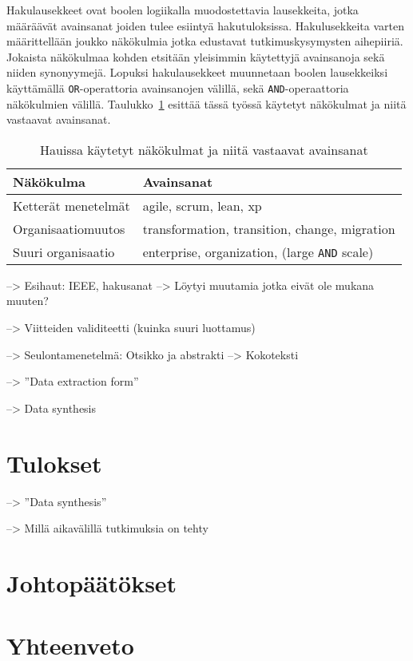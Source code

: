 Hakulausekkeet ovat boolen logiikalla muodostettavia lausekkeita, jotka
määräävät avainsanat joiden tulee esiintyä hakutuloksissa. Hakulusekkeita varten
määrittellään joukko näkökulmia jotka edustavat tutkimuskysymysten aihepiiriä.
Jokaista näkökulmaa kohden etsitään yleisimmin käytettyjä avainsanoja sekä
niiden synonyymejä. Lopuksi hakulausekkeet muunnetaan boolen lausekkeiksi
käyttämällä \texttt{OR}-operattoria avainsanojen välillä, sekä
\texttt{AND}-operaattoria näkökulmien välillä.
Taulukko~\ref{table:hakulausekkeet} esittää tässä työssä käytetyt näkökulmat ja
niitä vastaavat avainsanat.

\begin{table}
    \begin{tabular}{|l|l|}
        \hline
        Näkökulma           & Avainsanat   \\ \hline
        Ketterät menetelmät & agile, scrum, lean, xp \\ 
        Organisaatiomuutos  & transformation, transition, change, migration \\
        Suuri organisaatio  & enterprise, organization, (large \texttt{AND} scale) \\
        \hline
    \end{tabular}
	\caption{Hauissa käytetyt näkökulmat ja niitä vastaavat avainsanat}
	\label{table:hakulausekkeet}
\end{table}

--> Esihaut: IEEE, hakusanat --> Löytyi muutamia jotka eivät ole mukana muuten?

--> Viitteiden validiteetti (kuinka suuri luottamus)

--> Seulontamenetelmä: Otsikko ja abstrakti --> Kokoteksti

--> ''Data extraction form''

--> Data synthesis


\section{Tulokset}
\label{sec:tulokset}

--> ''Data synthesis'' \citep{Kitchenham2007}

--> Millä aikavälillä tutkimuksia on tehty


\section{Johtopäätökset}
\label{sec:johtopaatokset}





\section{Yhteenveto}
\label{sec:yhteenveto}




